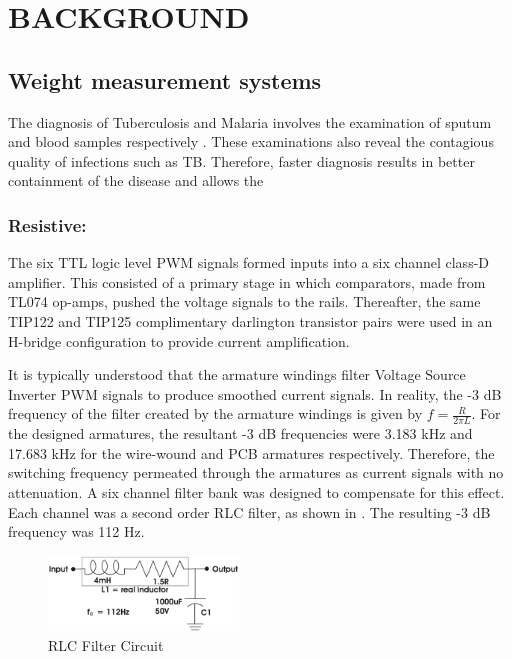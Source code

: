 \documentclass[10pt,twocolumn]{witseiepaper}
\begin{document}
\section{BACKGROUND}

\subsection{Weight measurement systems}

The diagnosis of Tuberculosis and Malaria involves the examination of sputum
and blood samples respectively \cite{phppo,biotec,STimes}.  These examinations
also reveal the contagious quality of infections such as TB.  Therefore,
faster diagnosis results in better containment of the disease and allows the

\subsubsection*{Resistive:}

The six TTL logic level PWM signals formed inputs into a six channel class-D
amplifier.  This consisted of a primary stage in which comparators, made from
TL074 op-amps, pushed the voltage signals to the rails.  Thereafter, the same
TIP122 and TIP125 complimentary darlington transistor pairs were used in an
H-bridge configuration to provide current amplification.

It is typically understood that the armature windings filter Voltage Source
Inverter PWM signals to produce smoothed current signals.  In reality, the
-3 dB frequency of the filter created by the armature windings is given by
$f=\frac{R}{2\pi L}$.  For the designed armatures, the resultant -3 dB
frequencies were 3.183 kHz and 17.683 kHz for the wire-wound and PCB armatures
respectively.  Therefore, the switching frequency permeated through the
armatures as current signals with no attenuation.  A six channel filter bank
was designed to compensate for this effect.  Each channel was a second order
RLC filter, as shown in .  The resulting -3 dB frequency was
112 Hz.

\begin{figure}[hb]
	\centering
		\includegraphics[width=0.45\textwidth]{../../Drawings/Filter.pdf}
	\caption{RLC Filter Circuit}
	\label{fig:Filter}
\end{figure}
\end{document}
